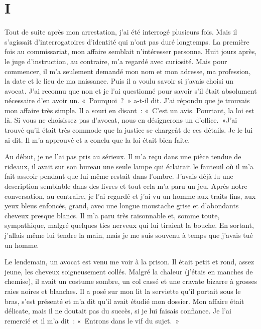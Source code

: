 \documentclass[french,twoside]{book} %
\newcommand\chapteropen{} %
\newcommand\chaptercont{} %
\begin{document}
\chapteropen
\chapter[{I}]{I}
\label{II1}

\chaptercont
\noindent Tout de suite après mon arrestation, j’ai été interrogé plusieurs fois. Mais il s’agissait d’interrogatoires d’identité qui n’ont pas duré longtemps. La première fois au commissariat, mon affaire semblait n’intéresser personne. Huit jours après, le juge d’instruction, au contraire, m’a regardé avec curiosité. Mais pour commencer, il m’a seulement demandé mon nom et mon adresse, ma profession, la date et le lieu de ma naissance. Puis il a voulu savoir si j’avais choisi un avocat. J'ai reconnu que non et je l’ai questionné pour savoir s’il était absolument nécessaire d’en avoir un. « Pourquoi ? » a-t-il dit. J'ai répondu que je trouvais mon affaire très simple. Il a souri en disant : « C'est un avis. Pourtant, la loi est là. Si vous ne choisissez pas d’avocat, nous en désignerons un d’office. »J'ai trouvé qu’il était très commode que la justice se chargeât de ces détails. Je le lui ai dit. Il m’a approuvé et a conclu que la loi était bien faite.\par
Au début, je ne l’ai pas pris au sérieux. Il m’a reçu dans une pièce tendue de rideaux, il avait sur son bureau une seule lampe qui éclairait le fauteuil où il m’a fait asseoir pendant que lui-même restait dans l’ombre. J'avais déjà lu une description semblable dans des livres et tout cela m’a paru un jeu. Après notre conversation, au contraire, je l’ai regardé et j’ai vu un homme aux traits fins, aux yeux bleus enfoncés, grand, avec une longue moustache grise et d’abondants cheveux presque blancs. Il m’a paru très raisonnable et, somme toute, sympathique, malgré quelques tics nerveux qui lui tiraient la bouche. En sortant, j’allais même lui tendre la main, mais je me suis souvenu à temps que j’avais tué un homme.\par
Le lendemain, un avocat est venu me voir à la prison. Il était petit et rond, assez jeune, les cheveux soigneusement collés. Malgré la chaleur (j’étais en manches de chemise), il avait un costume sombre, un col cassé et une cravate bizarre à grosses raies noires et blanches. Il a posé sur mon lit la serviette qu’il portait sous le bras, s’est présenté et m’a dit qu’il avait étudié mon dossier. Mon affaire était délicate, mais il ne doutait pas du succès, si je lui faisais confiance. Je l’ai remercié et il m’a dit : « Entrons dans le vif du sujet. »\par
\end{document}

